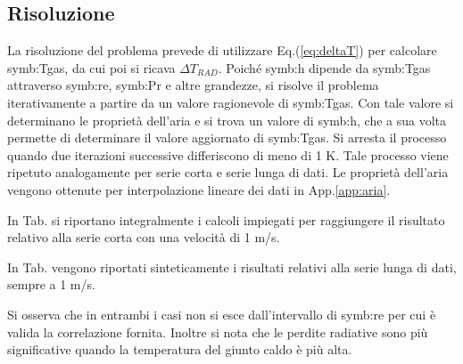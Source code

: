 \subsection{Risoluzione}
La risoluzione del problema prevede di utilizzare Eq.(\ref{eq:deltaT}) per calcolare \gls{symb:Tgas}, da cui poi si ricava $\Delta T_{\textit{RAD}}$. Poiché \gls{symb:h} dipende da \gls{symb:Tgas} attraverso \gls{symb:re}, \gls{symb:Pr} e altre grandezze, si risolve il problema iterativamente a partire da un valore ragionevole di \gls{symb:Tgas}. Con tale valore si determinano le proprietà dell'aria e si trova un valore di \gls{symb:h}, che a sua volta permette di determinare il valore aggiornato di \gls{symb:Tgas}. Si arresta il processo quando due iterazioni successive differiscono di meno di 1 K.
Tale processo viene ripetuto analogamente per serie corta e serie lunga di dati. 
Le proprietà dell'aria vengono ottenute per interpolazione lineare dei dati in App.\ref{app:aria}.

In Tab. si riportano integralmente i calcoli impiegati per raggiungere il risultato relativo alla serie corta con una velocità di 1 m/s. 



In Tab. vengono riportati sinteticamente i risultati relativi alla serie lunga di dati, sempre a 1 m/s.


Si osserva che in entrambi i casi non si esce dall'intervallo di \gls{symb:re} per cui è valida la correlazione fornita. Inoltre si nota che le perdite radiative sono più significative quando la temperatura del giunto caldo è più alta. 

